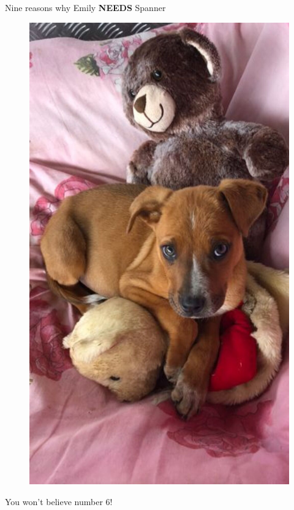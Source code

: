 \documentclass[12pt]{article}
\begin{document}
\begin{titlepage}
\begin{center}
\LARGE
\vspace{0.8cm}
Nine reasons why Emily \textbf{NEEDS} Spanner \\
\vspace{0.4cm}

\begin{figure}[h]
  \begin{center}
    \includegraphics[width=0.6\linewidth]{spanner.jpeg}
  \end{center}
\end{figure}

\Large
You won't believe number 6! \\


\end{center}
\end{titlepage}
\end{document}
